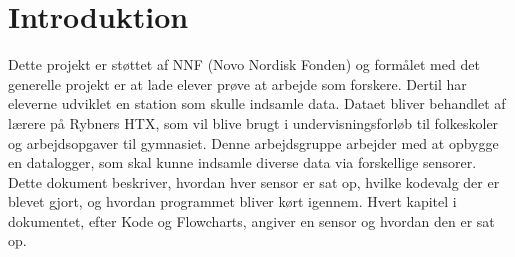 \section{Introduktion}\label{sec:introduktion}
	Dette projekt er støttet af NNF (Novo Nordisk Fonden) og formålet med det generelle projekt er at lade elever prøve at arbejde som forskere. Dertil har eleverne udviklet en station som skulle indsamle data. Dataet bliver behandlet af lærere på Rybners HTX, som vil blive brugt i undervisningsforløb til folkeskoler og arbejdsopgaver til gymnasiet. Denne arbejdsgruppe arbejder med at opbygge en datalogger, som skal kunne indsamle diverse data via forskellige sensorer. Dette dokument beskriver, hvordan hver sensor er sat op, hvilke kodevalg der er blevet gjort, og hvordan programmet bliver kørt igennem. Hvert kapitel i dokumentet, efter Kode og Flowcharts, angiver en sensor og hvordan den er sat op. 
